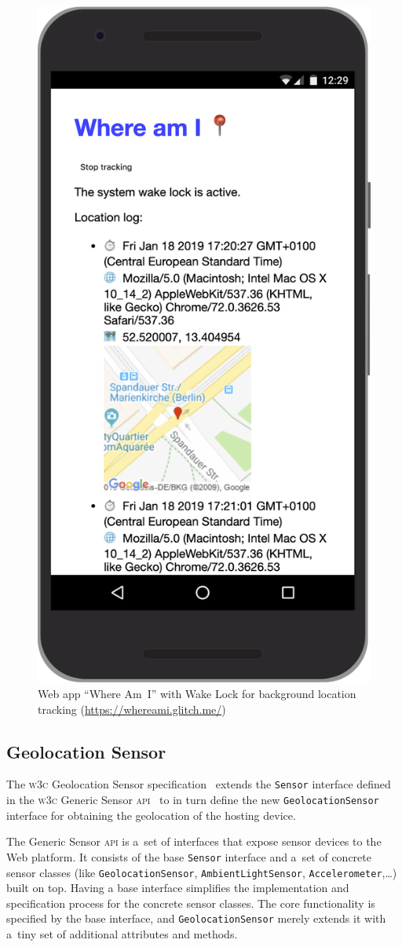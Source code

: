 \documentclass[sigconf,hyphens]{acmart}
\begin{document}
\begin{figure}[h]
  \includegraphics[width=0.5\columnwidth]{whereami.png}
  \caption{Web app ``Where Am~I''
    with Wake Lock for background location tracking (\url{https://whereami.glitch.me/})}
  \label{fig:wakelock}  
\end{figure}

\subsection{Geolocation Sensor}

The \textsc{w3c} Geolocation Sensor specification~\cite{kostiainen2018geolocation}
extends the \texttt{Sensor} interface defined in the
\textsc{w3c} Generic Sensor \textsc{api}~\cite{waldron2018genericsensor}
to in turn define the new \texttt{GeolocationSensor} interface
for obtaining the geolocation of the hosting device.

The Generic Sensor \textsc{api} is a~set of interfaces that expose sensor devices to the Web platform.
It consists of the base \texttt{Sensor} interface and a~set of concrete sensor classes
(like \texttt{GeolocationSensor}, \texttt{AmbientLightSensor}, \texttt{Accelerometer},\ldots) built on top.
Having a base interface simplifies the implementation and specification process for the concrete sensor classes.
The core functionality is specified by the base interface, and \texttt{GeolocationSensor}
merely extends it with a~tiny set of additional attributes and methods.
\end{document}
